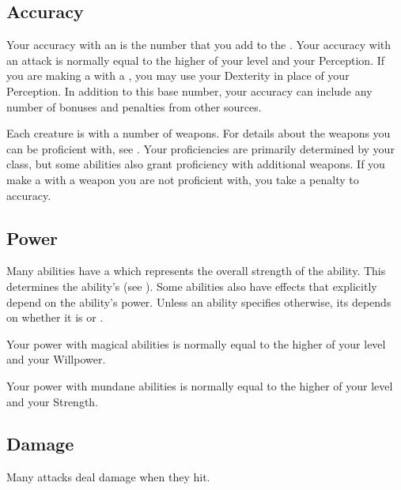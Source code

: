     \subsection{Accuracy}\label{Accuracy}
        Your accuracy with an  is the number that you add to the .
        Your accuracy with an attack is normally equal to the higher of your level and your Perception.
        If you are making a  with a , you may use your Dexterity in place of your Perception.
        In addition to this base number, your accuracy can include any number of bonuses and penalties from other sources.

         Each creature is  with a number of weapons.
        For details about the weapons you can be proficient with, see .
        Your proficiencies are primarily determined by your class, but some abilities also grant proficiency with additional weapons.
        If you make a  with a weapon you are not proficient with, you take a  penalty to accuracy.

    \subsection{Power}\label{Power}
        Many abilities have a  which represents the overall strength of the ability.
        This determines the ability's  (see ).
        Some abilities also have effects that explicitly depend on the ability's power.
        Unless an ability specifies otherwise, its  depends on whether it is  or .

        Your power with magical abilities is normally equal to the higher of your level and your Willpower.

        Your power with mundane abilities is normally equal to the higher of your level and your Strength.

    \subsection{Damage}\label{Damage}
        Many attacks deal damage when they hit.
